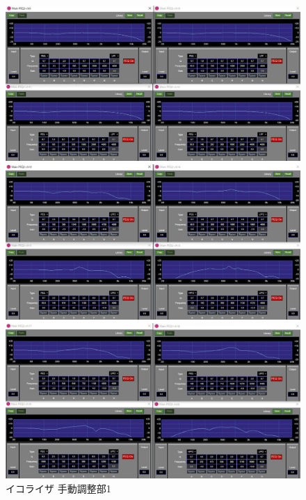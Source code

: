 \documentclass[11pt,a4j]{jreport}
\begin{document}
\begin{figure}[H]
  \begin{minipage}[b]{.5\linewidth}
    \centering
    \includegraphics[width=.9\linewidth]{images/experimentField/afcParameters/base04manualEQ3.jpg}
  \end{minipage}%
  \begin{minipage}[b]{.5\linewidth}
    \centering
    \includegraphics[width=.9\linewidth]{images/experimentField/afcParameters/base04manualEQ4.jpg}
  \end{minipage}

  \begin{minipage}[b]{1\linewidth}
    \centering
    \includegraphics[width=.45\linewidth]{images/experimentField/afcParameters/base04manualEQ5.jpg}
  \end{minipage}

  \centering
  \caption{イコライザ 手動調整部1}
  \label{fig:イコライザ手動調整部1}
\end{figure}
\end{document}
